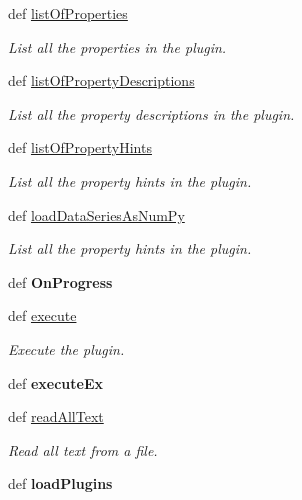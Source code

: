 \begin{DoxyCompactItemize}
\item 
def \hyperlink{classpython_1_1telplugins_1_1_plugin_a164f3353a5011ce929692e8c245f36c5}{list\-Of\-Properties}
\begin{DoxyCompactList}\small\item\em List all the properties in the plugin. \end{DoxyCompactList}\item 
def \hyperlink{classpython_1_1telplugins_1_1_plugin_a5ff6c70a0d04ae143d793aed7e47fed9}{list\-Of\-Property\-Descriptions}
\begin{DoxyCompactList}\small\item\em List all the property descriptions in the plugin. \end{DoxyCompactList}\item 
def \hyperlink{classpython_1_1telplugins_1_1_plugin_a7b07b2142cbc9384823f99cbef9c0edf}{list\-Of\-Property\-Hints}
\begin{DoxyCompactList}\small\item\em List all the property hints in the plugin. \end{DoxyCompactList}\item 
def \hyperlink{classpython_1_1telplugins_1_1_plugin_a185e216badc55e248976d4811f3c0844}{load\-Data\-Series\-As\-Num\-Py}
\begin{DoxyCompactList}\small\item\em List all the property hints in the plugin. \end{DoxyCompactList}\item 
\hypertarget{classpython_1_1telplugins_1_1_plugin_a5cf2b8d5c72067970b0b9e642fbb62b3}{def {\bfseries On\-Progress}}\label{classpython_1_1telplugins_1_1_plugin_a5cf2b8d5c72067970b0b9e642fbb62b3}

\item 
def \hyperlink{classpython_1_1telplugins_1_1_plugin_a0507c60e5a2ee11ac648433f79fe3e97}{execute}
\begin{DoxyCompactList}\small\item\em Execute the plugin. \end{DoxyCompactList}\item 
\hypertarget{classpython_1_1telplugins_1_1_plugin_ab3d71fa2c9787e1ad70be02aa015c64e}{def {\bfseries execute\-Ex}}\label{classpython_1_1telplugins_1_1_plugin_ab3d71fa2c9787e1ad70be02aa015c64e}

\item 
def \hyperlink{classpython_1_1telplugins_1_1_plugin_a6166ea0c8583ef1b560d1d46f7fb9ac6}{read\-All\-Text}
\begin{DoxyCompactList}\small\item\em Read all text from a file. \end{DoxyCompactList}\item 
\hypertarget{classpython_1_1telplugins_1_1_plugin_a629762005804234265ff6687e3a64982}{def {\bfseries load\-Plugins}}\label{classpython_1_1telplugins_1_1_plugin_a629762005804234265ff6687e3a64982}


\end{DoxyCompactItemize}
